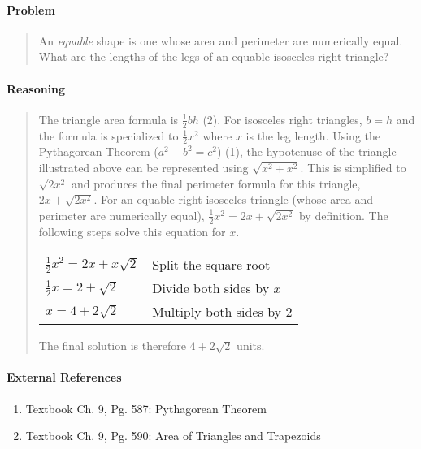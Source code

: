 \documentclass[letterpaper,12pt,twoside]{report}
\begin{document}
	\pagestyle{fancy}
	\fancyhf{}
	
	\paragraph{Problem}
	\begin{quote}
	\textsf{An \textit{equable} shape is one whose area and perimeter are numerically equal. What are the lengths of the legs of an equable isosceles right triangle?}
	\end{quote}
	
	\begin{center}
	\end{center}
	
	\paragraph{Reasoning}
	\begin{quotation}
	
	The triangle area formula is $\frac{1}{2}bh$ (2). For isosceles right triangles, $b=h$ and the formula is specialized to $\frac{1}{2}x^2$ where $x$ is the leg length. Using the Pythagorean Theorem ($a^2+b^2=c^2$) (1), the hypotenuse of the triangle illustrated above can be represented using $\sqrt{x^2+x^2}$. This is simplified to $\sqrt{2x^2}$ and produces the final perimeter formula for this triangle, $2x+\sqrt{2x^2}$. For an equable right isosceles triangle (whose area and perimeter are numerically equal), $\frac{1}{2}x^2 = 2x+\sqrt{2x^2}$ by definition. The following steps solve this equation for $x$.
	
	\begin{center}
		\begin{tabular}{l | l}
			$\frac{1}{2}x^2 = 2x+x\sqrt{2}$ & Split the square root \\
			$\frac{1}{2}x = 2+\sqrt{2}$ & Divide both sides by $x$ \\
			$x = 4+2\sqrt{2}$ & Multiply both sides by 2
		\end{tabular}
	\end{center}

	The final solution is therefore $\boxed{4+2\sqrt{2} \text{ units}}$.
	
	\end{quotation}
	
	\paragraph{External References}
	
	\begin{enumerate}
		\item Textbook Ch. 9, Pg. 587: Pythagorean Theorem
		\item Textbook Ch. 9, Pg. 590: Area of Triangles and Trapezoids
	\end{enumerate}
\end{document}
